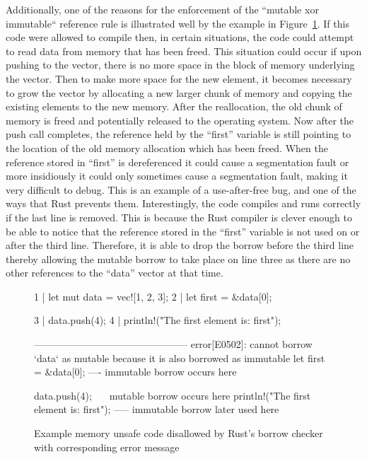 Additionally, one of the reasons for the enforcement of the ``mutable xor
immutable`` reference rule is illustrated well by the example in
Figure~\ref{fig:rust-xor-borrow-rule}. If this code were allowed to compile
then, in certain situations, the code could attempt to read data from memory
that has been freed. This situation could occur if upon pushing to the vector,
there is no more space in the block of memory underlying the vector. Then to
make more space for the new element, it becomes necessary to grow the vector by
allocating a new larger chunk of memory and copying the existing elements to
the new memory. After the reallocation, the old chunk of memory is freed and
potentially released to the operating system. Now after the push call
completes, the reference held by the ``first'' variable is still pointing to
the location of the old memory allocation which has been freed. When the
reference stored in ``first'' is dereferenced it could cause a segmentation
fault or more insidiously it could only sometimes cause a segmentation fault,
making it very difficult to debug. This is an example of a use-after-free bug,
and one of the ways that Rust prevents them. Interestingly, the code compiles
and runs correctly if the last line is removed. This is because the Rust
compiler is clever enough to be able to notice that the reference stored in the
``first'' variable is not used on or after the third line. Therefore, it is
able to drop the borrow before the third line thereby allowing the mutable
borrow to take place on line three as there are no other references to the
``data'' vector at that time.

\begin{figure}[h]
    \centering
    \begin{boxedverbatim}


1 | let mut data = vec![1, 2, 3];
2 | let first = &data[0];

3 | data.push(4);
4 | println!("The first element is: {first}");

-----------------------------------------------
error[E0502]: cannot borrow `data` as mutable because it is also borrowed as immutable
let first = &data[0];
             ---- immutable borrow occurs here

data.push(4);
^^^^^^^^^^^^ mutable borrow occurs here
println!("The first element is: {first}");
                                 ----- immutable borrow later used here
    \end{boxedverbatim}
    \caption[Example of memory unsafe code prevented by Rust]{Example memory
    unsafe code disallowed by Rust's borrow checker with corresponding error
    message}
    \label{fig:rust-xor-borrow-rule}
\end{figure}
